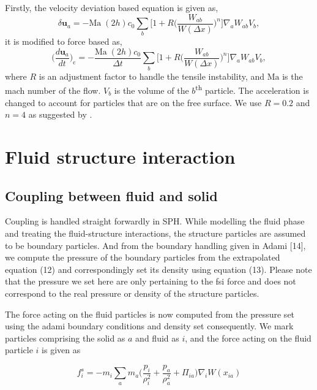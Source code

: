 \documentclass[preprint,12pt]{elsarticle}
\newcommand{\ten}[1]{\ensuremath{\mathbf{#1}}}
\begin{document}
Firstly, the velocity deviation based equation is given as,
\begin{equation}
  \label{eq:sun2019_pst}
  \delta \ten{u}_a = - \text{Ma} \; (2h) c_0 \sum_b \bigg[
  1 + R \bigg( \frac{W_{ab}}{W(\Delta x)} \bigg)^n  \bigg] \nabla_a W_{ab} V_b,
\end{equation}
%
it is modified to force based as,
\begin{equation}
  \label{eq:sun2019_pst}
  \bigg(\frac{d \ten{u}_a}{dt}\bigg)_{\text{c}} = - \frac{\text{Ma} \;
    (2h) c_0}{\Delta t} \sum_b \bigg[1 + R \bigg( \frac{W_{ab}}{W(\Delta x)} \bigg)^n
  \bigg] \nabla_a W_{ab} V_b,
\end{equation}
where $R$ is an adjustment factor to handle the tensile instability, and
$\text{Ma}$ is the mach number of the flow. $V_b$ is the volume of the
$b$\textsuperscript{th} particle. The acceleration is changed to account for
particles that are on the free surface. We use $R = 0.2$ and $n = 4$ as
suggested by \citet{sun_consistent_2019}.


\section{Fluid structure interaction}

\subsection{Coupling between fluid and solid}
\label{subsec:fsi-coupling}

Coupling is handled straight forwardly in SPH. While modelling the fluid phase
and treating the fluid-structure interactions, the structure particles are
assumed to be boundary particles. And from the boundary handling given in
Adami [14], we compute the pressure of the boundary particles from the
extrapolated equation (12) and correspondingly set its density using equation
(13). Please note that the pressure we set here are only pertaining to the fsi
force and does not correspond to the real pressure or density of the structure
particles.

The force acting on the fluid particles is now computed from the pressure set
using the adami boundary conditions and density set consequently. We mark
particles comprising the solid as $a$ and fluid as $i$, and the force acting
on the fluid particle $i$ is given as

\begin{equation}
  f_i^s = -m_i \sum_{a} m_a \bigg(\frac{p_i}{\rho_{i}^2} +
  \frac{p_a}{\rho_{a}^2} + \Pi_{ia} \bigg) \nabla_{i} W(x_{ia})
\end{equation}
\end{document}
